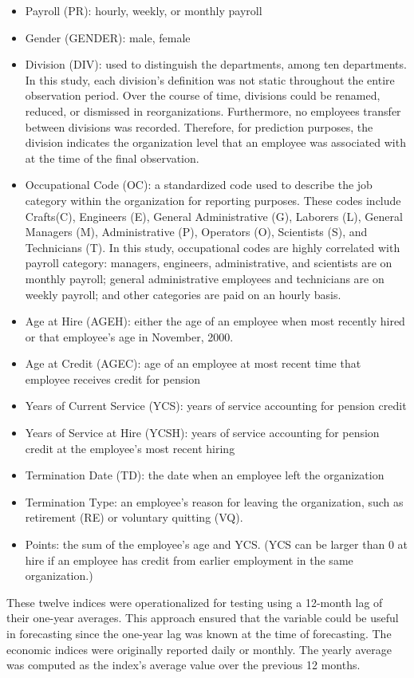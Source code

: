 \begin{itemize}
	\item Payroll (PR): hourly, weekly, or monthly payroll
	\item Gender (GENDER): male, female
	\item Division (DIV): used to distinguish the departments, among ten departments. In this study, each division's definition was not static throughout the entire observation period. Over the course of time, divisions could be renamed, reduced, or dismissed in reorganizations. Furthermore, no employees transfer between divisions was recorded. Therefore, for prediction purposes, the division indicates the organization level that an employee was associated with at the time of the final observation.
	\item Occupational Code (OC): a standardized code used to describe the job category within the organization for reporting purposes. These codes include Crafts(C), Engineers (E), General Administrative (G), Laborers (L), General Managers (M), Administrative (P), Operators (O), Scientists (S), and Technicians (T). In this study, occupational codes are highly correlated with payroll category: managers, engineers, administrative, and scientists are on monthly payroll; general administrative employees and technicians are on weekly payroll; and other categories are paid on an hourly basis.
	\item Age at Hire (AGEH): either the age of an employee when most recently hired or that employee's age in November, 2000.
	\item Age at Credit (AGEC): age of an employee at most recent time that employee receives credit for pension
	\item Years of Current Service (YCS): years of service accounting for pension credit
	\item Years of Service at Hire (YCSH): years of service accounting for pension credit at the employee's most recent hiring
	\item Termination Date (TD): the date when an employee left the organization
	\item Termination Type: an employee's reason for leaving the organization, such as retirement (RE) or voluntary quitting (VQ).
	\item Points: the sum of the employee's age and YCS. (YCS can be larger than 0 at hire if an employee has credit from earlier employment in the same organization.)
\end{itemize}
These twelve indices were operationalized for testing using a 12-month lag of their one-year averages. This approach ensured that the variable could be useful in forecasting since the one-year lag was known at the time of forecasting. The economic indices were originally reported daily or monthly. The yearly average was computed as the index's average value over the previous 12 months.

